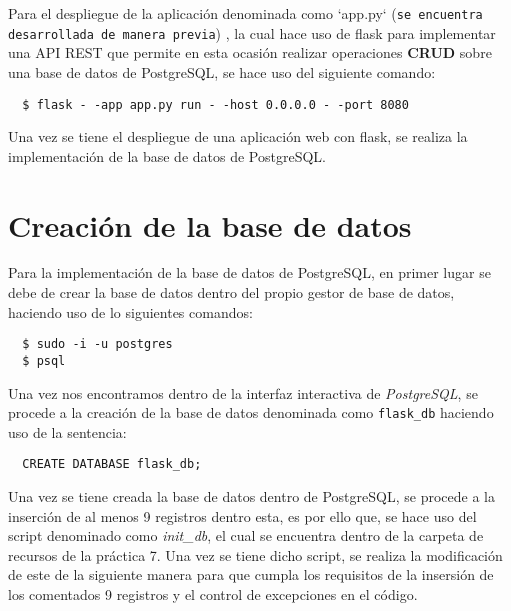 \documentclass[11pt]{report}
\begin{document}
Para el despliegue de la aplicación denominada como  `app.py` (\texttt{se encuentra desarrollada de manera previa}) , la cual hace uso de flask para implementar una API REST que permite en esta ocasión realizar operaciones \textbf{CRUD} sobre una base de datos de PostgreSQL, se hace uso del siguiente comando:

\begin{verbatim}
  $ flask - -app app.py run - -host 0.0.0.0 - -port 8080
\end{verbatim}

Una vez se tiene el  despliegue de una aplicación web con flask, se realiza la implementación de la base de datos de PostgreSQL.

\section{Creación de la base de datos}

Para la implementación de la base de datos de PostgreSQL, en primer lugar se debe de crear la base de datos dentro del propio gestor de base de datos, haciendo uso de lo siguientes comandos:

\begin{verbatim}
  $ sudo -i -u postgres
  $ psql
\end{verbatim}

Una vez nos encontramos dentro de la interfaz interactiva de \emph{PostgreSQL}, se procede a la creación de la base de datos denominada como \texttt{flask\_db} haciendo uso de la sentencia:

\begin{verbatim}
  CREATE DATABASE flask_db;
\end{verbatim}

Una vez se tiene creada la base de datos dentro de PostgreSQL, se procede a la inserción de al menos 9 registros dentro esta, es por ello que, se hace uso del script denominado como \emph{init\_db}, el cual se encuentra dentro de la carpeta de recursos de la práctica 7. Una vez se tiene dicho script, se realiza la modificación de este de la siguiente manera para que cumpla los requisitos de la insersión de los comentados 9 registros  y el control de excepciones en el código.
\end{document}
